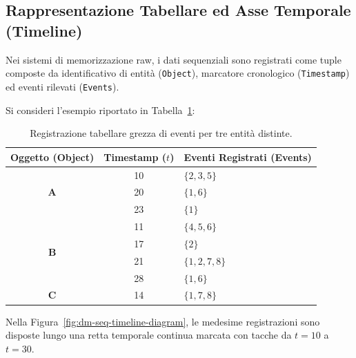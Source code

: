\FloatBarrier
\subsection{Rappresentazione Tabellare ed Asse Temporale (Timeline)}
Nei sistemi di memorizzazione raw, i dati sequenziali sono registrati come tuple composte da identificativo di entità (\texttt{Object}), marcatore cronologico (\texttt{Timestamp}) ed eventi rilevati (\texttt{Events}).

Si consideri l'esempio riportato in Tabella~\ref{tab:dm-seq-raw-table}:
\begin{table}[H]
\centering
\small
\renewcommand{\arraystretch}{1.2}
\begin{tabular}{c c l}
\toprule
\textbf{Oggetto (Object)} & \textbf{Timestamp ($t$)} & \textbf{Eventi Registrati (Events)} \\
\midrule
\multirow{3}{*}{\textbf{A}} & 10 & $\{2, 3, 5\}$ \\
                            & 20 & $\{1, 6\}$ \\
                            & 23 & $\{1\}$ \\
\midrule
\multirow{4}{*}{\textbf{B}} & 11 & $\{4, 5, 6\}$ \\
                            & 17 & $\{2\}$ \\
                            & 21 & $\{1, 2, 7, 8\}$ \\
                            & 28 & $\{1, 6\}$ \\
\midrule
\textbf{C}                  & 14 & $\{1, 7, 8\}$ \\
\bottomrule
\end{tabular}
\caption{Registrazione tabellare grezza di eventi per tre entità distinte.}
\label{tab:dm-seq-raw-table}
\end{table}

Nella Figura~\ref{fig:dm-seq-timeline-diagram}, le medesime registrazioni sono disposte lungo una retta temporale continua marcata con tacche da $t = 10$ a $t = 30$.


